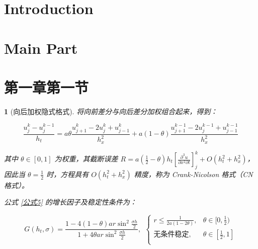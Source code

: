 \documentclass[a4paper]{article}  %
\theoremstyle{MyLineTheoremStyle} %
\theoremstyle{MyBlockTheoremStyle} %
\theoremstyle{MySubsubsectionStyle} %
\newtheorem{definition}{}
\begin{document}
\begin{multicols*}{4} %

















\section{Introduction}  
\lipsum[1-2] %

\section{Main Part}  
\lipsum[3-4]  
\lipsum[4-5]  
\lipsum[4-5]  

\section{第一章第一节}


\begin{definition}[向后加权隐式格式]

将向前差分与向后差分加权组合起来，得到：

\begin{equation}\label{公式5}
    \frac{u_{j}^{k}-u_{j}^{k-1}}{h_t}=a\theta\frac{u_{j+1}^{k}-2u_{j}^{k}+u_{j-1}^{k}}{h_x^2}+a(1-\theta)\frac{u_{j+1}^{k-1}-2u_{j}^{k-1}+u_{j-1}^{k-1}}{h_x^2}
\end{equation}

其中 $\theta \in [0, 1]$ 为权重，其截断误差 $R = a\left(\frac{1}{2}-\theta\right)h_t\left[\frac{\partial^{3}u}{\partial x^{2}\partial t}\right]_{j}^{k}+O(h_t^{2}+h_x^2)$，因此当 $\theta = \frac{1}{2}$ 时，方程具有 $O(h_t^{2}+h_x^2)$ 精度，称为 Crank-Nicolson 格式（CN 格式）。


公式 \ref{公式5} 的增长因子及稳定性条件为：

\begin{equation}
    G(h_t,\sigma)=\frac{1-4(1-\theta)ar\sin^2\frac{\sigma h}2}{1+4\theta ar\sin^2\frac{\sigma h}2}, \ \ 
    \begin{cases}
        r\leqslant\frac{1}{2a(1-2\theta)}, & \theta \in [0, \frac{1}{2}) \\ 
        \text{无条件稳定}, & \theta \in [\frac{1}{2}, 1] \\ 
    \end{cases}
\end{equation}



\end{definition}
\end{multicols*}
\end{document}
